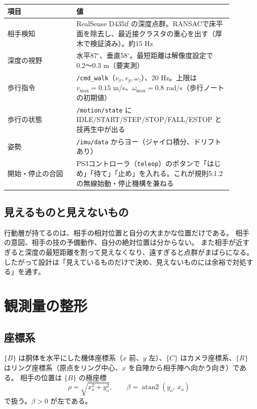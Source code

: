 \documentclass[a4paper,11pt]{ltjsarticle}
\newcommand{\code}[1]{\texttt{#1}}
\DeclareMathOperator{\atan}{atan2}
\begin{document}
\begin{center}\small
\begin{tabular}{p{0.28\linewidth}p{0.62\linewidth}}
\toprule
項目 & 値 \\
\midrule
相手検知 & RealSense D435if の深度点群。RANSACで床平面を除去し、最近接クラスタの重心を出す（厚木で検証済み）。約15 Hz \\
深度の視野 & 水平87$^\circ$、垂直58$^\circ$。最短距離は解像度設定で0.2〜0.3 m（要実測） \\
歩行指令 & \code{/cmd\_walk}（$v_x,v_y,\omega_z$）、20 Hz。上限は $v_{\max}=0.15$ m/s、$\omega_{\max}=0.8$ rad/s（歩行ノートの初期値） \\
歩行の状態 & \code{/motion/state} に IDLE/START/STEP/STOP/FALL/ESTOP と技再生中が出る \\
姿勢 & \code{/imu/data} からヨー（ジャイロ積分、ドリフトあり） \\
開始・停止の合図 & PS3コントローラ（\code{teleop}）のボタンで「はじめ」「待て」「止め」を入れる。これが規則5.1.2の無線始動・停止機構を兼ねる \\
\bottomrule
\end{tabular}
\end{center}

\subsection{見えるものと見えないもの}

行動層が持てるのは、相手の相対位置と自分の大まかな位置だけである。
相手の意図、相手の技の予備動作、自分の絶対位置は分からない。
また相手が近すぎると深度の最短距離を割って見えなくなり、遠すぎると点群がまばらになる。
したがって設計は「見えているものだけで決め、見えないものには余裕で対処する」を通す。

\section{観測量の整形}\label{sec:obs}

\subsection{座標系}

$\{B\}$ は胴体を水平にした機体座標系（$x$ 前、$y$ 左）、$\{C\}$ はカメラ座標系、$\{R\}$ はリング座標系（原点をリング中心、$x$ を自陣から相手陣へ向かう向き）である。
相手の位置は $\{B\}$ の極座標
\begin{equation}
\rho=\sqrt{x_o^2+y_o^2},\qquad \beta=\atan(y_o,\,x_o)
\end{equation}
で扱う。$\beta>0$ が左である。
\end{document}
